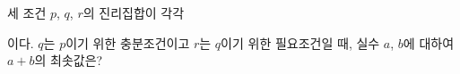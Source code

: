 세 조건 $p$, $q$, $r$의 진리집합이 각각\par\smallskip{}\par\smallskip\noindent 이다. $q$는 $p$이기 위한 충분조건이고 $r$는 $q$이기 위한 필요조건일 때, 실수 $a$, $b$에 대하여 $a+b$의 최솟값은?
